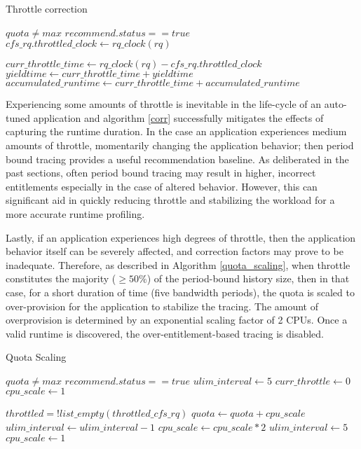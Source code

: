 \begin{algorithm}
\caption{Throttle correction}\label{corr}
\begin{algorithmic}
\Require $quota \ne max$
\Require $recommend.status == true$
  \State $cfs\_rq.throttled\_clock \gets rq\_clock(rq)$
\EndProcedure

  \State $curr\_throttle\_time \gets rq\_clock(rq) - cfs\_rq.throttled\_clock$
       \State $yieldtime \gets curr\_throttle\_time + yieldtime$
       \State $accumulated\_runtime \gets curr\_throttle\_time + accumulated\_runtime$
  \EndIf
\EndProcedure
\end{algorithmic}
\end{algorithm}

Experiencing some amounts of throttle is inevitable in the life-cycle of an auto-tuned application and algorithm \ref{corr} successfully mitigates the effects of capturing the runtime duration. In the case an application experiences medium amounts of throttle, momentarily changing the application behavior; then period bound tracing provides a useful recommendation baseline. As deliberated in the past sections, often period bound tracing may result in higher, incorrect entitlements especially in the case of altered behavior. However, this can significant aid in quickly reducing throttle and stabilizing the workload for a more accurate runtime profiling.

Lastly, if an application experiences high degrees of throttle, then the application behavior itself can be severely affected, and correction factors may prove to be inadequate. Therefore, as described in Algorithm \ref{quota_scaling}, when throttle constitutes the majority ($\ge 50\%$) of the period-bound history size, then in that case, for a short duration of time (five bandwidth periods), the quota is scaled to over-provision for the application to stabilize the tracing. The amount of overprovision is determined by an exponential scaling factor of 2 CPUs. Once a valid runtime is discovered, the over-entitlement-based tracing is disabled.
\begin{algorithm}
\caption{Quota Scaling}\label{quota_scaling}
\begin{algorithmic}
\Require $quota \ne max$
\Require $recommend.status == true$
\State $ulim\_interval \gets 5$
\State $curr\_throttle \gets 0$
\State $cpu\_scale \gets 1$

  \State $throttled = !list\_empty(throttled\_cfs\_rq)$
        \State $quota \gets quota + cpu\_scale$
        \State $ulim\_interval \gets ulim\_interval - 1$
        \State $cpu\_scale \gets cpu\_scale * 2$
     \Else
        \State $ulim\_interval \gets 5$
        \State $cpu\_scale \gets 1$
    \EndIf
  \EndIf

\EndProcedure
\end{algorithmic}
\end{algorithm}

